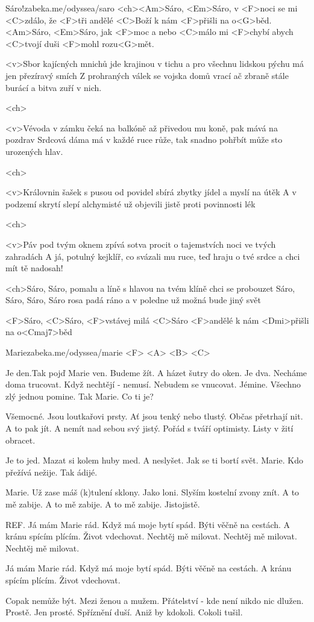 

\songtitlepage
\listofsongs[1]
\begin{song}[Traband]{1}{Sáro!}{zabeka.me/odyssea/saro}
<ch><Am>Sáro, <Em>Sáro, v <F>noci se mi <C>zdálo,
že <F>tři andělé <C>Boží k nám <F>přišli na o<G>běd.
<Am>Sáro, <Em>Sáro, jak <F>moc a nebo <C>málo
mi <F>chybí abych <C>tvojí duši <F>mohl rozu<G>mět.

<v>Sbor kajícných mnichů jde krajinou v tichu 
a pro všechnu lidskou pýchu má jen přezíravý smích 
Z prohraných válek se vojska domů vrací 
ač zbraně stále burácí a bitva zuří v nich.

<ch>

<v>Vévoda v zámku čeká na balkóně 
až přivedou mu koně, pak mává na pozdrav 
Srdcová dáma má v každé ruce růže, 
tak snadno pohřbít může sto urozených hlav.

<ch>

<v>Královnin šašek s pusou od povidel 
sbírá zbytky jídel a myslí na útěk 
A v podzemí skrytí slepí alchymisté 
už objevili jistě proti povinnosti lék

<ch>

<v>Páv pod tvým oknem zpívá sotva procit 
o tajemstvích noci ve tvých zahradách 
A já, potulný kejklíř, co svázali mu ruce, 
teď hraju o tvé srdce a chci mít tě nadosah!

<ch>Sáro, Sáro, pomalu a líně 
s hlavou na tvém klíně chci se probouzet 
Sáro, Sáro, Sáro, Sáro rosa padá ráno 
a v poledne už možná bude jiný svět

<F>Sáro, <C>Sáro, <F>vstávej milá <C>Sáro 
<F>andělé k nám <Dmi>přišli na o<Cmaj7>běd


\end{song}
\begin{song}{2}{Marie}{zabeka.me/odyssea/marie}
<F> <A> <B> <C>

Je den.Tak pojď Marie ven.
Budeme žít. A házet šutry do oken.
Je dva. Necháme doma trucovat.
Když nechtějí - nemusí. Nebudem se vnucovat. 
Jémine. Všechno zlý jednou pomine.
Tak Marie. Co ti je?

Všemocné. Jsou loutkařovi prsty.
Ať jsou tenký nebo tlustý. Občas přetrhají nit.
A to pak jít. A nemít nad sebou svý jistý.
Pořád s tváří optimisty. Listy v žití obracet.

Je to jed. Mazat si kolem huby med.
A neslyšet. Jak se ti bortí svět.
Marie. Kdo přežívá nežije. Tak ádijé.

Marie. Už zase máš (k)tulení sklony.
Jako loni. Slyším kostelní zvony znít.
A to mě zabije. A to mě zabije.
A to mě zabije. Jistojistě.

REF.
Já mám Marie rád. Když má moje bytí spád.
Býti věčně na cestách. A kránu spícím plícím.
Život vdechovat. Nechtěj mě milovat.
Nechtěj mě milovat. Nechtěj mě milovat.

Já mám Marie rád. Když má moje bytí spád.
Býti věčně na cestách. A kránu spícím plícím.
Život vdechovat.

Copak nemůže být. Mezi ženou a mužem.
Přátelství - kde není nikdo nic dlužen. Prostě.
Jen prosté. Spříznění duší.
Aniž by kdokoli. Cokoli tušil.

\end{song}
